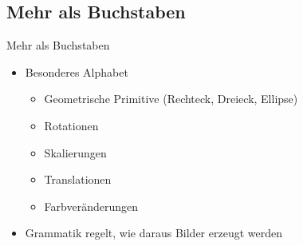 \documentclass{beamer}
\theoremstyle{example}
\begin{document}
\subsection{Mehr als Buchstaben}
\begin{frame}{Mehr als Buchstaben}
  \begin{itemize}
  \item Besonderes Alphabet
    \begin{itemize}
    \item Geometrische Primitive (Rechteck, Dreieck, Ellipse)
    \item Rotationen
    \item Skalierungen
    \item Translationen
    \item Farbveränderungen
    \end{itemize}
  \item Grammatik regelt, wie daraus Bilder erzeugt werden
  \end{itemize}
\end{frame}
\end{document}
